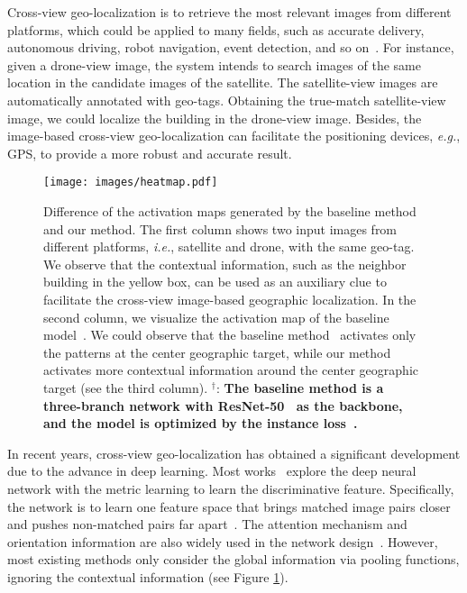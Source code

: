 \documentclass[journal]{IEEEtran}
\def\eg{\emph{e.g.}}
\def\ie{\emph{i.e.}}
\begin{document}
\IEEEPARstart
{C}{ross-view} geo-localization is to retrieve the most relevant images from different platforms, which could be applied to many fields, such as accurate delivery, autonomous driving, robot navigation, event detection, and so on~\cite{shi_spatial-aware_nodate,zheng_university-1652_nodate,workman_location_2015,liu_lending_2019}. For instance, given a drone-view image, the system intends to search images of the same location in the candidate images of the satellite. The satellite-view images are automatically annotated with geo-tags. Obtaining the true-match satellite-view image, we could localize the building in the drone-view image. Besides, the image-based cross-view geo-localization can facilitate the positioning devices, \eg, GPS, to provide a more robust and accurate result.
\par
\begin{figure}[htbp]
  \centering
  \texttt{[image: images/heatmap.pdf]}
  \caption{Difference of the activation maps generated by the baseline method~\cite{zheng_university-1652_nodate} and our method. The first column shows two input images from different platforms, \ie, satellite and drone, with the same geo-tag. We observe that the contextual information, such as the neighbor building in the yellow box, can be used as an auxiliary clue to facilitate the cross-view image-based geographic localization. 
  In the second column, we visualize the activation map of the baseline model~\cite{zheng_university-1652_nodate}. We could observe that the baseline method~\cite{zheng_university-1652_nodate} activates only the patterns at the center geographic target, while our method activates more contextual information around the center geographic target (see the third column). ${}^{\dag}$: \textbf{The baseline method is a three-branch network with ResNet-50~\cite{he2016deep} as the backbone, and the model is optimized by the instance loss~\cite{zheng2020dual}.}
  }
  \label{fig:1}
\end{figure}

In recent years, cross-view geo-localization has obtained a significant development due to the advance in deep learning. Most works~\cite{shi_spatial-aware_nodate,liu_lending_2019,shi_optimal_nodate,Shi_2020_CVPR,hu_cvm-net_2018} explore the deep neural network with the metric learning to learn the discriminative feature. Specifically, the network is to learn one feature space that brings matched image pairs closer and pushes non-matched pairs far apart~\cite{hadsell2006dimensionality,deng2018image,schroff2015facenet}. The attention mechanism and orientation information are also widely used in the network design~\cite{shi_spatial-aware_nodate,fu2019sta,liu_lending_2019}. However, most existing methods only consider the global information via pooling functions, ignoring the contextual information (see Figure \ref{fig:1}).  
\end{document}
